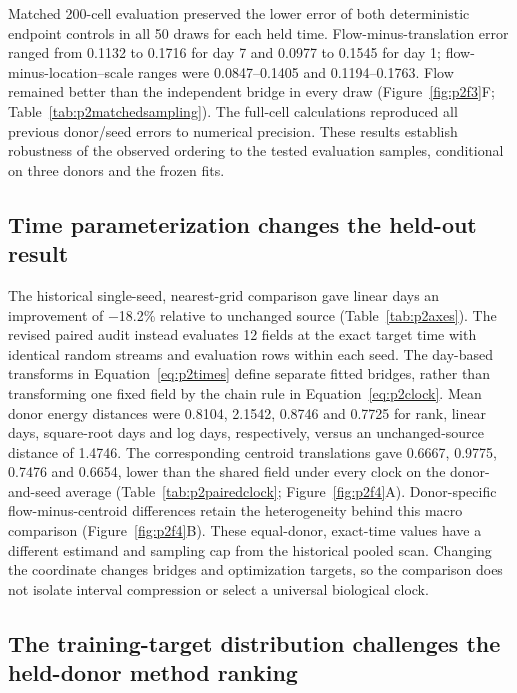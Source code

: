 Matched 200-cell evaluation preserved the lower error of both deterministic endpoint controls in all 50 draws for each held time. Flow-minus-translation error ranged from 0.1132 to 0.1716 for day 7 and 0.0977 to 0.1545 for day 1; flow-minus-location--scale ranges were 0.0847--0.1405 and 0.1194--0.1763. Flow remained better than the independent bridge in every draw (Figure~\ref{fig:p2f3}F; Table~\ref{tab:p2matchedsampling}). The full-cell calculations reproduced all previous donor/seed errors to numerical precision. These results establish robustness of the observed ordering to the tested evaluation samples, conditional on three donors and the frozen fits.

\subsection{Time parameterization changes the held-out result}

The historical single-seed, nearest-grid comparison gave linear days an improvement of −18.2\% relative to unchanged source (Table~\ref{tab:p2axes}). The revised paired audit instead evaluates 12 fields at the exact target time with identical random streams and evaluation rows within each seed. The day-based transforms in Equation~\eqref{eq:p2times} define separate fitted bridges, rather than transforming one fixed field by the chain rule in Equation~\eqref{eq:p2clock}. Mean donor energy distances were 0.8104, 2.1542, 0.8746 and 0.7725 for rank, linear days, square-root days and log days, respectively, versus an unchanged-source distance of 1.4746. The corresponding centroid translations gave 0.6667, 0.9775, 0.7476 and 0.6654, lower than the shared field under every clock on the donor-and-seed average (Table~\ref{tab:p2pairedclock}; Figure~\ref{fig:p2f4}A\label{call:p2f4}). Donor-specific flow-minus-centroid differences retain the heterogeneity behind this macro comparison (Figure~\ref{fig:p2f4}B). These equal-donor, exact-time values have a different estimand and sampling cap from the historical pooled scan. Changing the coordinate changes bridges and optimization targets, so the comparison does not isolate interval compression or select a universal biological clock.





\subsection{The training-target distribution challenges the held-donor method ranking}

